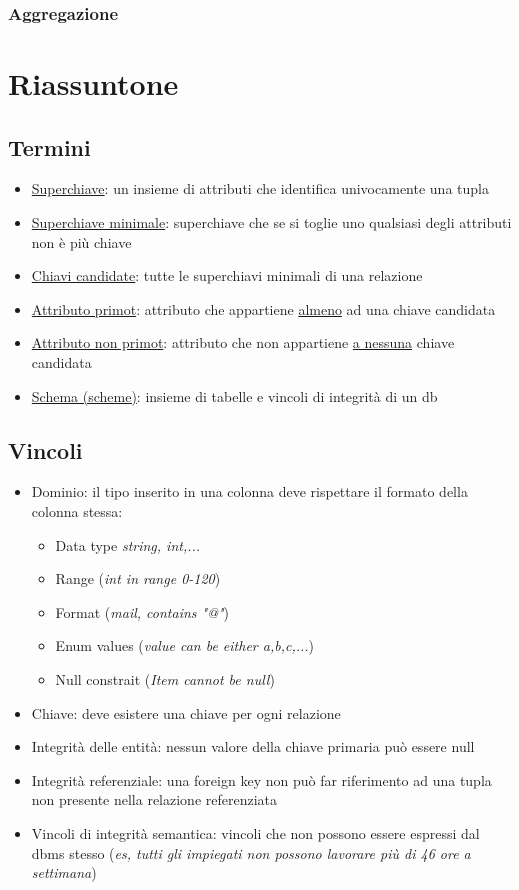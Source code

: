\subsubsection*{Aggregazione}
\section{Riassuntone}
\subsection{Termini}
\begin{itemize}
	\item \underline{Superchiave}: un insieme di attributi che identifica univocamente una tupla
	\item \underline{Superchiave minimale}: superchiave che se si toglie uno qualsiasi degli attributi non è più chiave
	\item \underline{Chiavi candidate}: tutte le superchiavi minimali di una relazione
	\item \underline{Attributo primot}: attributo che appartiene \underline{almeno} ad una chiave candidata
	\item \underline{Attributo non primot}: attributo che non appartiene \underline{a nessuna} chiave candidata
	\item \underline{Schema (scheme)}: insieme di tabelle e vincoli di integrità di un db
\end{itemize}
\subsection{Vincoli}
\begin{itemize}
	\item Dominio: il tipo inserito in una colonna deve rispettare il formato della colonna stessa:
	      \begin{itemize}
		      \item Data type \textit{\textit{string, int,...}}
		      \item Range (\textit{int in range 0-120})
		      \item Format (\textit{mail, contains "@"})
		      \item Enum values (\textit{value can be either a,b,c,...})
		      \item Null constrait (\textit{Item cannot be null})
	      \end{itemize}
	\item Chiave: deve esistere una chiave per ogni relazione
	\item Integrità delle entità: nessun valore della chiave primaria può essere null
	\item Integrità referenziale: una foreign key non può far riferimento ad una tupla non presente nella relazione referenziata
	\item Vincoli di integrità semantica: vincoli che non possono essere espressi dal dbms stesso (\textit{es, tutti gli impiegati non possono lavorare più di 46 ore a settimana})
\end{itemize}
